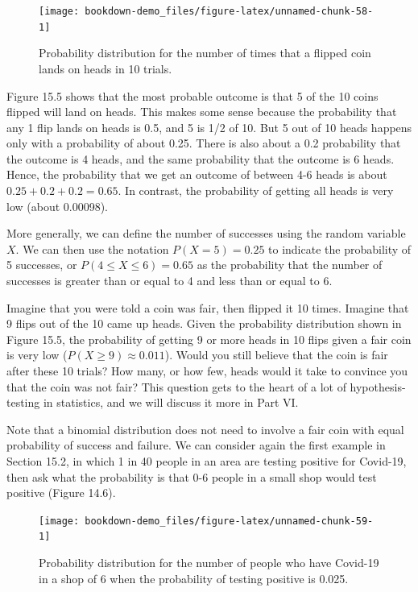 \documentclass[
]{scrbook}
\begin{document}
\begin{figure}
\texttt{[image: bookdown-demo\_files/figure-latex/unnamed-chunk-58-1]} \caption{Probability distribution for the number of times that a flipped coin lands on heads in 10 trials.}\label{fig:unnamed-chunk-58}
\end{figure}

Figure 15.5 shows that the most probable outcome is that 5 of the 10 coins flipped will land on heads.
This makes some sense because the probability that any 1 flip lands on heads is 0.5, and 5 is 1/2 of 10.
But 5 out of 10 heads happens only with a probability of about 0.25.
There is also about a 0.2 probability that the outcome is 4 heads, and the same probability that the outcome is 6 heads.
Hence, the probability that we get an outcome of between 4-6 heads is about \(0.25 + 0.2 + 0.2 = 0.65\).
In contrast, the probability of getting all heads is very low (about 0.00098).

More generally, we can define the number of successes using the random variable \(X\).
We can then use the notation \(P(X = 5) = 0.25\) to indicate the probability of 5 successes, or \(P(4 \leq X \leq 6) = 0.65\) as the probability that the number of successes is greater than or equal to 4 and less than or equal to 6.

Imagine that you were told a coin was fair, then flipped it 10 times.
Imagine that 9 flips out of the 10 came up heads.
Given the probability distribution shown in Figure 15.5, the probability of getting 9 or more heads in 10 flips given a fair coin is very low (\(P(X \geq 9) \approx 0.011\)).
Would you still believe that the coin is fair after these 10 trials?
How many, or how few, heads would it take to convince you that the coin was not fair?
This question gets to the heart of a lot of hypothesis-testing in statistics, and we will discuss it more in Part VI.

Note that a binomial distribution does not need to involve a fair coin with equal probability of success and failure.
We can consider again the first example in Section 15.2, in which 1 in 40 people in an area are testing positive for Covid-19, then ask what the probability is that 0-6 people in a small shop would test positive (Figure 14.6).

\begin{figure}
\texttt{[image: bookdown-demo\_files/figure-latex/unnamed-chunk-59-1]} \caption{Probability distribution for the number of people who have Covid-19 in a shop of 6 when the probability of testing positive is 0.025.}\label{fig:unnamed-chunk-59}
\end{figure}
\end{document}
